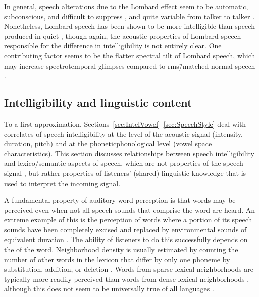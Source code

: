 In general, speech alterations due to the Lombard effect seem to be automatic, subconscious, and difficult to suppress \citep{PickEtAl1989}, and quite variable from talker to talker \citep{Junqua1993}.  Nonetheless, Lombard speech has been shown to be more intelligible than speech produced in quiet \citep{DreherONeill1957, SummersEtAl1988}, though again, the acoustic properties of Lombard speech responsible for the difference in intelligibility is not entirely clear.  One contributing factor seems to be the flatter spectral tilt of Lombard speech, which may increase spectrotemporal glimpses compared to \ac{rms}\=/matched normal speech \citep{LuCooke2009}.


\subsection{Intelligibility and linguistic content\label{sec:IntelLingContent}}
To a first approximation, Sections~\ref{sec:IntelVowel}–\ref{sec:SpeechStyle} deal with correlates of speech intelligibility at the level of the acoustic signal (intensity, duration, pitch) and at the phonetic\slsh phonological level (vowel space characteristics).  This section discusses relationships between speech intelligibility and lexico\-/semantic aspects of speech, which are not properties of the speech signal \perse, but rather properties of listeners’ (shared) linguistic knowledge that is used to interpret the incoming signal.

A fundamental property of auditory word perception is that words may be perceived even when not all speech sounds that comprise the word are heard.  An extreme example of this is the perception of words where a portion of its speech sounds have been completely excised and replaced by environmental sounds of equivalent duration \citep{Warren1970}.  The ability of listeners to do this successfully depends on the  of the word.  Neighborhood density is usually estimated by counting the number of other words in the lexicon that differ by only one phoneme by substitution, addition, or deletion \citep{LucePisoni1998}.  Words from sparse lexical neighborhoods are typically more readily perceived than words from dense lexical neighborhoods \citep{VitevitchLuce1998, ZieglerEtAl2003}, although this does not seem to be universally true of all languages \citep{VitevitchRodriguez2005}.%

